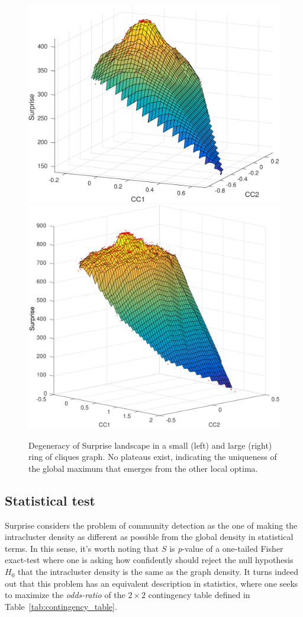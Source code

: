 \begin{figure}[ht]
\centering
\includegraphics[height=0.4\textwidth]{images/degeneracy_surprise_n_5_c_24.png}\hfill
\includegraphics[height=0.4\textwidth]{images/degeneracy_surprise_n6_c30.png}
\caption{Degeneracy of Surprise landscape in a small (left) and large (right) ring of cliques graph. No plateaus exist, indicating the uniqueness of the global maximum that emerges from the other local optima.}
\label{fig:degeneracy_surprise}
\end{figure}

\subsection{Statistical test}\label{sec:surprisefishertest}
Surprise considers the problem of community detection as the one of making the intracluster density as different as possible from the global density in statistical terms. In this sense, it's worth noting that $S$ is \emph{p}-value of a one-tailed Fisher exact-test where one is asking how confidently should reject the null hypothesis $H_0$ that the intracluster density is the same as the graph density.
It turns indeed out that this problem has an equivalent description in statistics, where one seeks to maximize the \emph{odds-ratio} of the $2 \times 2$ contingency table defined in Table~\ref{tab:contingency_table}.

